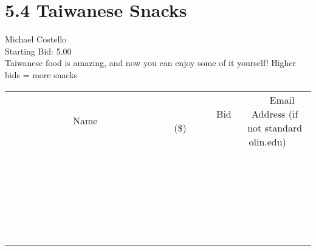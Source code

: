 \documentclass[11pt]{article}
\begin{document}
					\section*{5.4 Taiwanese Snacks}
					Michael Costello \\
					Starting Bid: 5.00 \\
					Taiwanese food is amazing, and now you can enjoy some of it yourself! Higher bids = more snacks \\
					[6ex]
					\begin{tabular}{c c c}
						~~~~~~~~~~~~~Name~~~~~~~~~~~~~ & ~~~~~~~~~Bid (\$)~~~~~~~~~ & ~~~Email Address (if not standard olin.edu)~~~ \\
				
 & & \\
\hline
 & & \\
\hline
 & & \\
\hline
 & & \\
\hline
 & & \\
\hline
 & & \\
\hline
 & & \\
\hline
 & & \\
\hline
 & & \\
\hline
 & & \\
\hline
 & & \\
\hline
 & & \\
\hline
 & & \\
\hline
 & & \\
\hline
 & & \\
\hline
 & & \\
\hline
 & & \\
\hline
 & & \\
\hline
 & & \\
\hline
 & & \\
\hline
 & & \\
\hline
 & & \\
\hline
 & & \\
\hline
 & & \\
\hline
 & & \\
\hline
 & & \\
\hline
					\end{tabular}
					\clearpage
				
\end{document}
